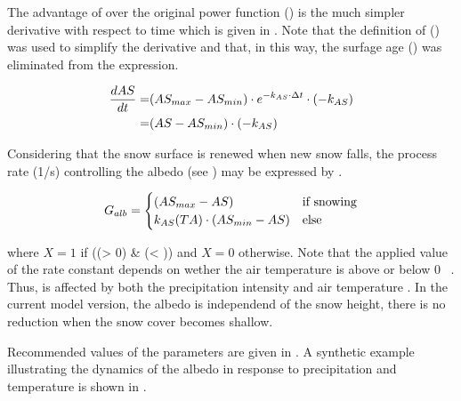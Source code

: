 The advantage of  over the original power function () is the much simpler derivative with respect to time which is given in . Note that the definition of \snowAlbedo{} () was used to simplify the derivative and that, in this way, the surfage age (\deltat) was eliminated from the expression.

\begin{align} \label{eqn:snow-enBal_albedo-expfunc-deriv}
  \frac{d AS}{dt} = & (AS_{max} - AS_{min}) \cdot e^{-k_{AS} \cdot \Delta t} \cdot (-k_{AS}) \nonumber \\
                           = & (AS - AS_{min}) \cdot (-k_{AS})
\end{align}

Considering that the snow surface is renewed when new snow falls, the process rate \albedoChangeRate{} (1/s) controlling the albedo (see ) may be expressed by .

\begin{align} \label{eqn:snow-enBal_albedo-agingRate}
  G_{alb}=
  \begin{cases}
     (AS_{max} - AS) & \text{if snowing} \\
     k_{AS}(TA) \cdot (AS_{min} - AS) & \text{else} \\
  \end{cases}
\end{align}

where $X=1$ if ((\precipIntensity > 0) \& (\airtemp < \airtempRainSnow)) and $X=0$ otherwise. Note that the applied value of the rate constant \snowAlbedoDecrConst{} depends on wether the air temperature is above or below 0~\celsius{} \citep{Dyck1995} . Thus, \albedoChangeRate{} is affected by both the precipitation intensity \precipIntensity{} and air temperature \airtemp. In the current model version, the albedo is independend of the snow height, \ie{} there is no reduction when the snow cover becomes shallow.

Recommended values of the parameters are given in . A synthetic example illustrating the dynamics of the albedo in response to precipitation and temperature is shown in .


